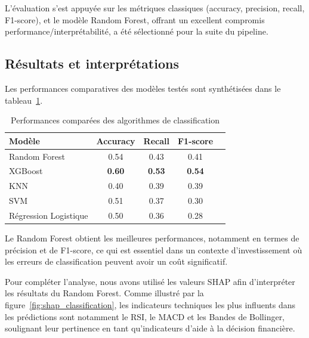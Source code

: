 \documentclass[a4paper,12pt]{article}
\begin{document}
L'évaluation s'est appuyée sur les métriques classiques (accuracy, precision, recall, F1-score), et le modèle Random Forest, offrant un excellent compromis performance/interprétabilité, a été sélectionné pour la suite du pipeline.

\subsection*{Résultats et interprétations}

Les performances comparatives des modèles testés sont synthétisées dans le tableau~\ref{tab:classification_performance}.

\begin{table}[h!]
\centering
\begin{tabular}{|l|c|c|c|c|}
\hline
\textbf{Modèle} & \textbf{Accuracy} & \textbf{Recall} & \textbf{F1-score}\\
\hline
Random Forest & 0.54 & 0.43 & 0.41\\
XGBoost & \textbf{0.60} & \textbf{0.53}  & \textbf{0.54}\\
KNN & 0.40 & 0.39  & 0.39\\
SVM & 0.51 & 0.37  & 0.30\\
Régression Logistique &  0.50 & 0.36 & 0.28\\
\hline
\end{tabular}
\caption{Performances comparées des algorithmes de classification}
\label{tab:classification_performance}
\end{table}

Le Random Forest obtient les meilleures performances, notamment en termes de précision et de F1-score, ce qui est essentiel dans un contexte d’investissement où les erreurs de classification peuvent avoir un coût significatif.

Pour compléter l’analyse, nous avons utilisé les valeurs SHAP afin d’interpréter les résultats du Random Forest. Comme illustré par la figure~\ref{fig:shap_classification}, les indicateurs techniques les plus influents dans les prédictions sont notamment le RSI, le MACD et les Bandes de Bollinger, soulignant leur pertinence en tant qu'indicateurs d'aide à la décision financière.
\end{document}
